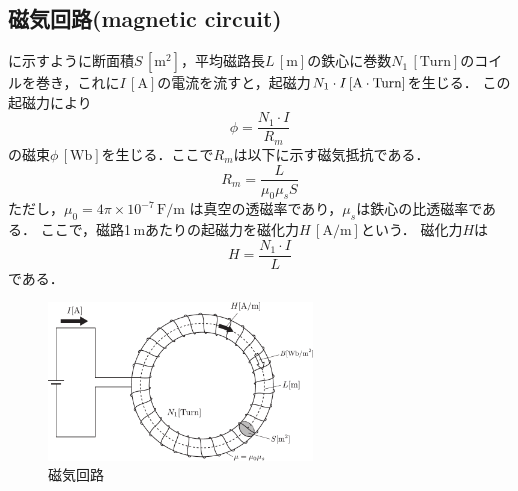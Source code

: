 \subsection{磁気回路(magnetic circuit)}
に示すように断面積$S\,[\mathrm{m}^2]$，平均磁路長$L\,[\mathrm{m}]$の鉄心に巻数$N_1\,[\mathrm{Turn}]$のコイルを巻き，これに$I\,[\mathrm{A}]$の電流を流すと，起磁力$N_1\cdot I\,[\mathrm{A}\cdot\rm{Turn}]$を生じる．
この起磁力により
\begin{equation}
	\phi = \frac{N_1\cdot I}{R_m}
\end{equation}
の磁束$\phi\,[\mathrm{Wb}]$を生じる．ここで$R_m$は以下に示す磁気抵抗である．
\begin{equation}
	R_m= \frac{L}{\mu_0 \mu_s S}
\end{equation}
ただし，$\mu_0 = 4\pi\times 10^{-7}\,\mathrm{F/m}$ は真空の透磁率であり，$\mu_s$は鉄心の比透磁率である．
ここで，磁路1\,mあたりの起磁力を磁化力$H\,[\mathrm{A/m}]$という． 磁化力$H$は
\begin{equation}
	H=\frac{N_1\cdot I}{L}
\end{equation}
である．
\begin{figure}[htbp]
	\centering
	\includegraphics[width=70mm]{fig/magnetism_circuit.pdf}
	\caption{磁気回路}
	\label{fig:hys:jikikairo}
\end{figure}

